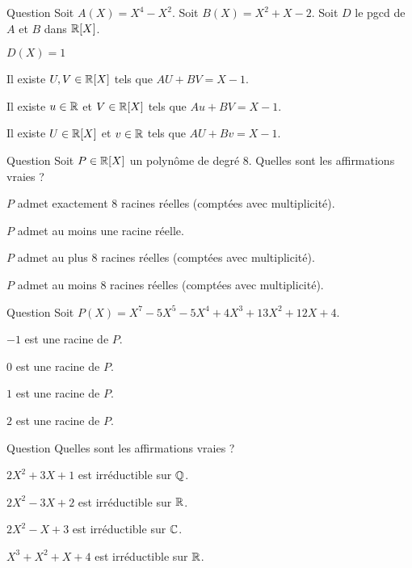 \begin{multi}[multiple,feedback=
{\(A(X)=X^2(X-1)^2\), \(B(X)=(X-1)(X+2)\), \(D(X)=X-1\). \(U(X)= -\frac14\), \(V(X)=\frac14(X^2-X+2)\) donnent \(AU+BV=D\).
}]{Question}
Soit \(A(X) = X^4-X^2\). Soit \(B(X) = X^2+X-2\).
Soit \(D\) le pgcd de \(A\) et \(B\) dans \(\mathbb{R}[X]\).

    \item \(D(X) = 1\)
    \item* Il existe \(U,V \in \mathbb{R}[X]\) tels que \(AU+BV = X-1\).
    \item* Il existe \(u \in \mathbb{R}\) et \(V \in \mathbb{R}[X]\) tels que \(Au+BV = X-1\).
    \item Il existe \(U\in \mathbb{R}[X]\) et \(v \in \mathbb{R}\) tels que \(AU+Bv = X-1\).
\end{multi}


\begin{multi}[multiple,feedback=
{Il y a au plus \(\deg P\) racines réelles (comptées avec multiplicité).
}]{Question}
Soit \(P \in \mathbb{R}[X]\) un polynôme de degré \(8\).
Quelles sont les affirmations vraies ?

    \item \(P\) admet exactement \(8\) racines réelles (comptées avec multiplicité).
    \item \(P\) admet au moins une racine réelle.
    \item* \(P\) admet au plus \(8\) racines réelles (comptées avec multiplicité).
    \item \(P\) admet au moins \(8\) racines réelles (comptées avec multiplicité).
\end{multi}


\begin{multi}[multiple,feedback=
{Calculer \(P(\alpha)\). En fait \(P(X) = (X-2)^2(X+1)^3(X^2+X+1)\).
}]{Question}
Soit \(P(X) = X^7 - 5 X^5 - 5 X^4 + 4 X^3 + 13 X^2 + 12 X + 4\).

    \item* \(-1\) est une racine de \(P\).
    \item \(0\) est une racine de \(P\).
    \item \(1\) est une racine de \(P\).
    \item* \(2\) est une racine de \(P\).
\end{multi}


\begin{multi}[multiple,feedback=
{Sur \(\Cc\) les irréductibles sont de degré \(1\). Sur \(\Rr\) ils sont de degré 1, ou bien de degré \(2\) à discriminant strictement négatif.
}]{Question}
Quelles sont les affirmations vraies ?

    \item \(2X^2+3X+1\) est irréductible sur \(\mathbb{Q}\).
    \item* \(2X^2-3X+2\) est irréductible sur \(\Rr\).
    \item \(2X^2-X+3\) est irréductible sur \(\Cc\).
    \item \(X^3+X^2+X+4\) est irréductible sur \(\Rr\).
\end{multi}


